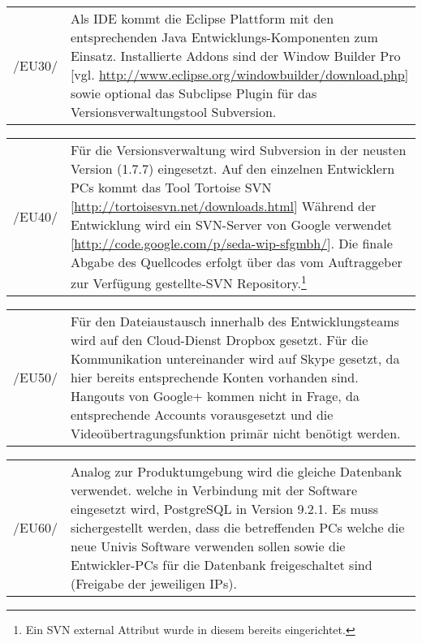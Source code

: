 \begin{tabular}{p{1.5cm}p{14.5cm}}

	 /EU30/	&  Als IDE kommt die Eclipse Plattform mit den entsprechenden Java Entwicklungs-Komponenten zum Einsatz. Installierte Addons sind der Window Builder Pro [vgl. \url{http://www.eclipse.org/windowbuilder/download.php}] sowie optional das Subclipse Plugin für das Versionsverwaltungstool Subversion.\\[0.25cm]

\end{tabular}

\begin{tabular}{p{1.5cm}p{14.5cm}}

	 /EU40/	&  Für die Versionsverwaltung wird Subversion in der neusten Version (1.7.7) eingesetzt. Auf den einzelnen Entwicklern PCs kommt das Tool Tortoise SVN [\url{http://tortoisesvn.net/downloads.html}]
Während der Entwicklung wird ein SVN-Server von Google verwendet [\url{http://code.google.com/p/seda-wip-sfgmbh/}]. Die finale Abgabe des Quellcodes erfolgt über das vom Auftraggeber zur Verfügung gestellte-SVN Repository.\footnote{Ein SVN external Attribut wurde in diesem bereits eingerichtet.}\\[0.25cm]

\end{tabular}

\begin{tabular}{p{1.5cm}p{14.5cm}}

	 /EU50/	&  Für den Dateiaustausch innerhalb des Entwicklungsteams wird auf den Cloud-Dienst Dropbox gesetzt.
Für die Kommunikation untereinander wird auf Skype gesetzt, da hier bereits entsprechende Konten vorhanden sind. Hangouts von Google+ kommen nicht in Frage, da entsprechende Accounts vorausgesetzt und die Videoübertragungsfunktion primär nicht benötigt werden.\\[0.25cm]

\end{tabular}



\begin{tabular}{p{1.5cm}p{14.5cm}}

	 /EU60/	&  Analog zur Produktumgebung wird die gleiche Datenbank verwendet. welche in Verbindung mit der Software eingesetzt wird, PostgreSQL in Version 9.2.1.
Es muss sichergestellt werden, dass die betreffenden PCs welche die neue Univis Software verwenden sollen sowie die Entwickler-PCs für die Datenbank freigeschaltet sind (Freigabe der jeweiligen IPs).\\[0.25cm]

\end{tabular}

